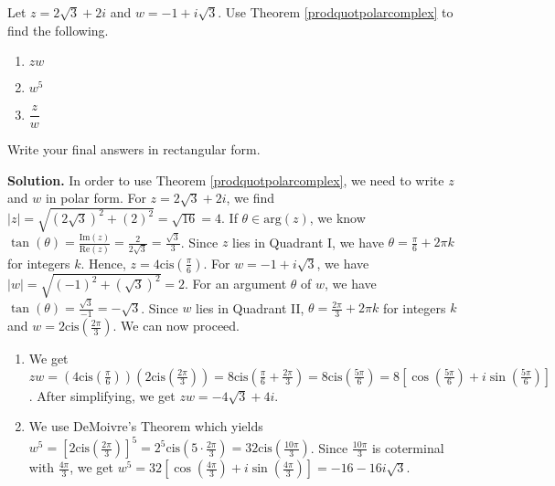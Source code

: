 \begin{ex}  \label{polararithmeticex} Let $z = 2\sqrt{3} + 2i$ and $w = -1 + i\sqrt{3}$.  Use Theorem \ref{prodquotpolarcomplex} to find the following.

\begin{multicols}{3}

\begin{enumerate}

\item $zw$

\item  $w^5$

\item $\dfrac{z}{w}$

\end{enumerate}

\end{multicols}

Write your final answers in rectangular form.

\medskip

{\bf Solution.}  In order to use Theorem \ref{prodquotpolarcomplex}, we need to write $z$ and $w$ in polar form.  For $z=2\sqrt{3} + 2i$, we find $|z| = \sqrt{(2\sqrt{3})^2 + (2)^2} = \sqrt{16} = 4$.  If $\theta \in \text{arg}(z)$, we know $\tan(\theta) = \frac{\text{Im}(z)}{\text{Re}(z)} = \frac{2}{2\sqrt{3}} = \frac{\sqrt{3}}{3}$.  Since $z$ lies in Quadrant I, we have $\theta = \frac{\pi}{6} + 2\pi k$ for integers $k$.  Hence, $z = 4 \text{cis}\left(\frac{\pi}{6}\right)$. For $w = -1 + i\sqrt{3}$, we have $|w| = \sqrt{(-1)^2+(\sqrt{3})^2} = 2$.  For an argument $\theta$ of $w$, we have $\tan(\theta) = \frac{\sqrt{3}}{-1} = -\sqrt{3}$.  Since $w$ lies in Quadrant II,  $\theta = \frac{2\pi}{3} + 2\pi k$ for integers $k$ and $w = 2\text{cis}\left(\frac{2\pi}{3}\right)$.  We can now proceed.

\begin{enumerate}

\item  We get $zw = \left(4 \text{cis}\left(\frac{\pi}{6}\right)\right) \left(2\text{cis}\left(\frac{2\pi}{3}\right)\right) = 8\text{cis}\left(\frac{\pi}{6} + \frac{2\pi}{3}\right) = 8\text{cis}\left(\frac{5\pi}{6}\right) = 8\left[ \cos\left(\frac{5\pi}{6}\right) + i\sin\left(\frac{5\pi}{6}\right) \right]$.  After simplifying, we get $zw = -4\sqrt{3} + 4i$.

\item We use DeMoivre's Theorem which yields $w^{5} = \left[2\text{cis}\left(\frac{2\pi}{3}\right)\right]^{5} = 2^{5} \text{cis} \left(5\cdot \frac{2\pi}{3}\right) = 32 \text{cis}\left(\frac{10\pi}{3}\right)$.  Since $\frac{10\pi}{3}$ is coterminal with $\frac{4\pi}{3}$, we get $w^{5} = 32\left[ \cos\left(\frac{4\pi}{3}\right) + i\sin\left(\frac{4\pi}{3}\right) \right] = -16-16i\sqrt{3}$.


\end{enumerate}
\end{ex}
